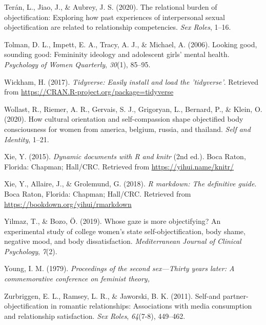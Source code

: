 \documentclass[man]{apa6}
\begin{document}
\hypertarget{ref-teran2020relational}{}
Terán, L., Jiao, J., \& Aubrey, J. S. (2020). The relational burden of
objectification: Exploring how past experiences of interpersonal sexual
objectification are related to relationship competencies. \emph{Sex
Roles}, 1--16.

\hypertarget{ref-tolman2006looking}{}
Tolman, D. L., Impett, E. A., Tracy, A. J., \& Michael, A. (2006).
Looking good, sounding good: Femininity ideology and adolescent girls'
mental health. \emph{Psychology of Women Quarterly}, \emph{30}(1),
85--95.

\hypertarget{ref-R-tidyverse}{}
Wickham, H. (2017). \emph{Tidyverse: Easily install and load the
'tidyverse'}. Retrieved from
\url{https://CRAN.R-project.org/package=tidyverse}

\hypertarget{ref-wollast2020cultural}{}
Wollast, R., Riemer, A. R., Gervais, S. J., Grigoryan, L., Bernard, P.,
\& Klein, O. (2020). How cultural orientation and self-compassion shape
objectified body consciousness for women from america, belgium, russia,
and thailand. \emph{Self and Identity}, 1--21.

\hypertarget{ref-R-knitr}{}
Xie, Y. (2015). \emph{Dynamic documents with R and knitr} (2nd ed.).
Boca Raton, Florida: Chapman; Hall/CRC. Retrieved from
\url{https://yihui.name/knitr/}

\hypertarget{ref-R-rmarkdown}{}
Xie, Y., Allaire, J., \& Grolemund, G. (2018). \emph{R markdown: The
definitive guide}. Boca Raton, Florida: Chapman; Hall/CRC. Retrieved
from \url{https://bookdown.org/yihui/rmarkdown}

\hypertarget{ref-yilmaz2019whose}{}
Yilmaz, T., \& Bozo, Ö. (2019). Whose gaze is more objectifying? An
experimental study of college women's state self-objectification, body
shame, negative mood, and body dissatisfaction. \emph{Mediterranean
Journal of Clinical Psychology}, \emph{7}(2).

\hypertarget{ref-young1979}{}
Young, I. M. (1979). \emph{Proceedings of the second sex---Thirty years
later: A commemorative conference on feminist theory,}

\hypertarget{ref-zurbriggen2011self}{}
Zurbriggen, E. L., Ramsey, L. R., \& Jaworski, B. K. (2011). Self-and
partner-objectification in romantic relationships: Associations with
media consumption and relationship satisfaction. \emph{Sex Roles},
\emph{64}(7-8), 449--462.

\endgroup
\end{document}
